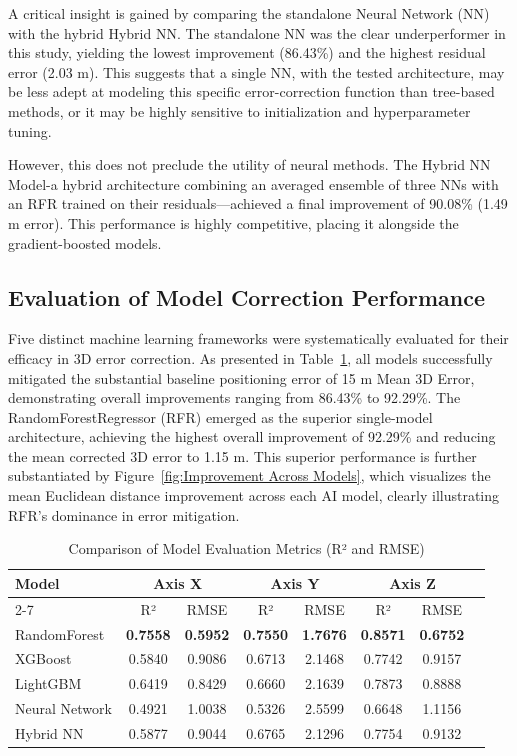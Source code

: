 \documentclass{isprs} %
\begin{document}
A critical insight is gained by comparing the standalone Neural Network (NN) with the hybrid Hybrid NN. The standalone NN was the clear underperformer in this study, yielding the lowest improvement (86.43\%) and the highest residual error (2.03 m). This suggests that a single NN, with the tested architecture, may be less adept at modeling this specific error-correction function than tree-based methods, or it may be highly sensitive to initialization and hyperparameter tuning.

However, this does not preclude the utility of neural methods. The Hybrid NN Model-a hybrid architecture combining an averaged ensemble of three NNs with an RFR trained on their residuals—achieved a final improvement of 90.08\% (1.49 m error). This performance is highly competitive, placing it alongside the gradient-boosted models.


\subsection{Evaluation of Model Correction Performance}\label{sec:5.1 Evaluation of Model Correction Performance}

Five distinct machine learning frameworks were systematically evaluated for their efficacy in 3D error correction. As presented in Table~\ref{tab:model_evaluation_updated}, all models successfully mitigated the substantial baseline positioning error of 15 m Mean 3D Error, demonstrating overall improvements ranging from 86.43\% to 92.29\%. The RandomForestRegressor (RFR) emerged as the superior single-model architecture, achieving the highest overall improvement of 92.29\% and reducing the mean corrected 3D error to 1.15 m. This superior performance is further substantiated by Figure~\ref{fig:Improvement Across Models}, which visualizes the mean Euclidean distance improvement across each AI model, clearly illustrating RFR's dominance in error mitigation.

\begin{table}[htbp!]
	\centering
	\renewcommand{\arraystretch}{1.5}
	\setlength{\tabcolsep}{10pt}
	\begin{tabular}{|l|c|c|c|c|c|c|c|}\hline
		\multirow{2}{*}{Model} & \multicolumn{2}{c|}{Axis X} & \multicolumn{2}{c|}{Axis Y} & \multicolumn{2}{c|}{Axis Z}\\\cline{2-7}
		& R² & RMSE & R² & RMSE & R² & RMSE\\\hline
		RandomForest & \textbf{0.7558} & \textbf{0.5952} & \textbf{0.7550} & \textbf{1.7676} & \textbf{0.8571} & \textbf{0.6752}\\
		XGBoost & 0.5840 & 0.9086 & 0.6713 & 2.1468 & 0.7742 & 0.9157\\
		LightGBM & 0.6419 & 0.8429 & 0.6660 & 2.1639 & 0.7873 & 0.8888 \\
		Neural Network & 0.4921 & 1.0038 & 0.5326 & 2.5599 & 0.6648 & 1.1156 \\
		Hybrid NN & 0.5877 & 0.9044 & 0.6765 & 2.1296 & 0.7754 & 0.9132 \\\hline
	\end{tabular}
	\caption{Comparison of Model Evaluation Metrics (R² and RMSE)}
	\label{tab:model_evaluation_updated}
\end{table}
\end{document}
